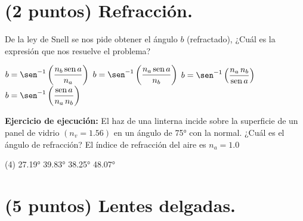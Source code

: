 \documentclass[12pt, letter]{exam}
\begin{document}
\begin{questions}
    \newpage

    \section{(2 puntos) Refracción.}

    \question De la ley de Snell se nos pide obtener el ángulo $b$ (refractado), ¿Cuál es la expresión que nos resuelve el problema?
    \begin{multicols}{2}
    \begin{tasks}
        \task $ b = \sen^{-1} \left(\dfrac{n_{b} \, \text{sen} \, a}{n_{a}} \right)$
        \task $ b = \sen^{-1} \left(\dfrac{n_{a} \, \text{sen} \, a}{n_{b}} \right)$
        \task $ b = \sen^{-1} \left(\dfrac{n_{a} \, n_{b}}{\text{sen} \, a} \right)$
        \task $ b = \sen^{-1} \left(\dfrac{\text{sen} \, a}{n_{a} \, n_{b}} \right)$
    \end{tasks}
    \end{multicols}
    \question \label{Ejercicio_06} \textbf{Ejercicio de ejecución: } El haz de una linterna incide sobre la superficie de un panel de vidrio $(n_{v} = 1.56)$ en un ángulo de \ang{75} con la normal. ¿Cuál es el ángulo de refracción? El índice de refracción del aire es $n_{a} = 1.0$
    \begin{tasks}(4)
        \task \ang{27.19}
        \task \ang{39.83}
        \task \ang{38.25}
        \task \ang{48.07}
    \end{tasks}

    \section{(5 puntos) Lentes delgadas.}


\end{questions}
\end{document}
